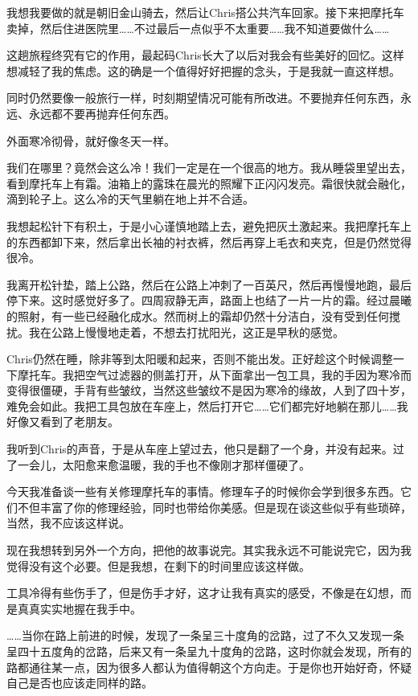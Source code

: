 \documentclass[UTF8]{article}
\begin{document}
\par 我想我要做的就是朝旧金山骑去，然后让Chris搭公共汽车回家。接下来把摩托车卖掉，然后住进医院里……不过最后一点似乎不太重要……我不知道要做什么……
\par 这趟旅程终究有它的作用，最起码Chris长大了以后对我会有些美好的回忆。这样想减轻了我的焦虑。这的确是一个值得好好把握的念头，于是我就一直这样想。
\par 同时仍然要像一般旅行一样，时刻期望情况可能有所改进。不要抛弃任何东西，永远、永远都不要再抛弃任何东西。
\par 外面寒冷彻骨，就好像冬天一样。
\par 我们在哪里？竟然会这么冷！我们一定是在一个很高的地方。我从睡袋里望出去，看到摩托车上有霜。油箱上的露珠在晨光的照耀下正闪闪发亮。霜很快就会融化，滴到轮子上。这么冷的天气里躺在地上并不合适。
\par 我想起松针下有积土，于是小心谨慎地踏上去，避免把灰土激起来。我把摩托车上的东西都卸下来，然后拿出长袖的衬衣裤，然后再穿上毛衣和夹克，但是仍然觉得很冷。
\par 我离开松针垫，踏上公路，然后在公路上冲刺了一百英尺，然后再慢慢地跑，最后停下来。这时感觉好多了。四周寂静无声，路面上也结了一片一片的霜。经过晨曦的照射，有一些已经融化成水。然而树上的霜却仍然十分洁白，没有受到任何搅扰。我在公路上慢慢地走着，不想去打扰阳光，这正是早秋的感觉。
\par Chris仍然在睡，除非等到太阳暖和起来，否则不能出发。正好趁这个时候调整一下摩托车。我把空气过滤器的侧盖打开，从下面拿出一包工具，我的手因为寒冷而变得很僵硬，手背有些皱纹，当然这些皱纹不是因为寒冷的缘故，人到了四十岁，难免会如此。我把工具包放在车座上，然后打开它……它们都完好地躺在那儿……我好像又看到了老朋友。
\par 我听到Chris的声音，于是从车座上望过去，他只是翻了一个身，并没有起来。过了一会儿，太阳愈来愈温暖，我的手也不像刚才那样僵硬了。
\par 今天我准备谈一些有关修理摩托车的事情。修理车子的时候你会学到很多东西。它们不但丰富了你的修理经验，同时也带给你美感。但是现在谈这些似乎有些琐碎，当然，我不应该这样说。
\par 现在我想转到另外一个方向，把他的故事说完。其实我永远不可能说完它，因为我觉得没有这个必要。但是我想，在剩下的时间里应该这样做。
\par 工具冷得有些伤手了，但是伤手才好，这才让我有真实的感受，不像是在幻想，而是真真实实地握在我手中。
\par ……当你在路上前进的时候，发现了一条呈三十度角的岔路，过了不久又发现一条呈四十五度角的岔路，后来又有一条呈九十度角的岔路，这时你就会发现，所有的路都通往某一点，因为很多人都认为值得朝这个方向走。于是你也开始好奇，怀疑自己是否也应该走同样的路。
\end{document}
